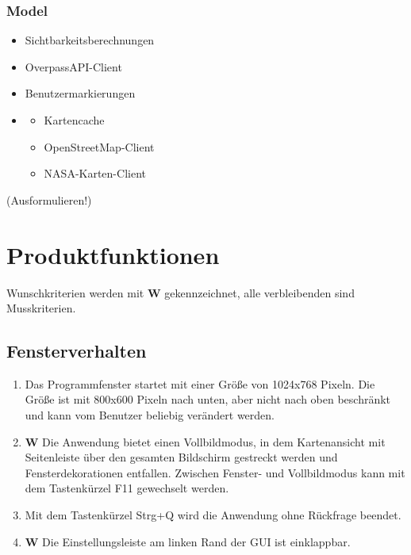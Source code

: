 \documentclass[10pt]{scrreprt}
\begin{document}
\subsection*{Model}
\begin{itemize}
\item Sichtbarkeitsberechnungen
\item OverpassAPI-Client
\item Benutzermarkierungen
\item \begin{itemize}
\item Kartencache
\item OpenStreetMap-Client
\item NASA-Karten-Client
\end{itemize}
\end{itemize}
\vspace{1cm}(Ausformulieren!)


\chapter{Produktfunktionen}

\renewcommand{\labelenumi}{\textbf{/F\numprint{\theenumi}0/}}

\newcommand{\W}{\textbf{W }}
Wunschkriterien werden mit \W  gekennzeichnet, alle verbleibenden sind Musskriterien.

\section{Fensterverhalten}
\begin{enumerate}[leftmargin=2cm]
\item Das Programmfenster startet mit einer Größe von 1024x768 Pixeln. Die Größe ist mit 800x600 Pixeln nach unten, aber nicht nach oben beschränkt und kann vom Benutzer beliebig  verändert werden.
\item \W Die Anwendung bietet einen Vollbildmodus, in dem Kartenansicht mit Seitenleiste über den gesamten Bildschirm gestreckt werden und Fensterdekorationen entfallen. Zwischen Fenster- und Vollbildmodus kann mit dem Tastenkürzel F11 gewechselt werden.
\item Mit dem Tastenkürzel Strg+Q wird die Anwendung ohne Rückfrage beendet.
\item \W Die Einstellungsleiste am linken Rand der GUI ist einklappbar.
\end{enumerate}
\end{document}
